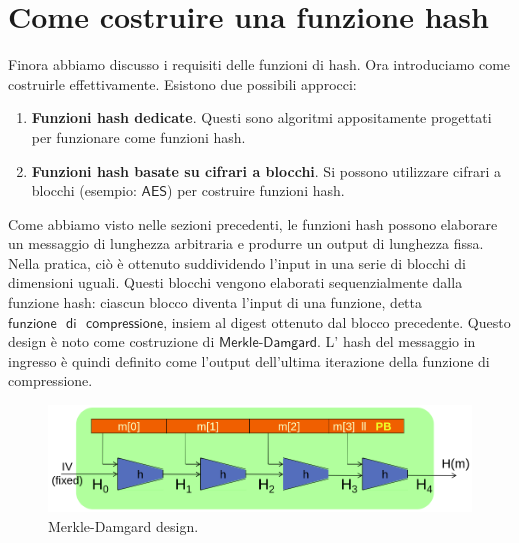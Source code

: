\documentclass{article}
\begin{document}
\section{Come costruire una funzione hash}
\par \noindent Finora abbiamo discusso i requisiti delle funzioni di hash. Ora introduciamo come costruirle effettivamente. 
Esistono due possibili approcci:

\begin{enumerate}
    \item \textbf{Funzioni hash dedicate}. Questi sono algoritmi appositamente progettati per funzionare come funzioni hash.
    \item \textbf{Funzioni hash basate su cifrari a blocchi}. Si possono utilizzare cifrari a blocchi (esempio: $\mathsf{AES}$) per costruire funzioni hash.
\end{enumerate}

\noindent Come abbiamo visto nelle sezioni precedenti, le funzioni hash possono elaborare un messaggio di lunghezza 
arbitraria e produrre un output di lunghezza fissa. Nella pratica, ciò è ottenuto suddividendo l'input in una serie 
di blocchi di dimensioni uguali. Questi blocchi vengono elaborati sequenzialmente dalla funzione hash: ciascun blocco 
diventa l'input di una funzione, detta $\mathsf{funzione \text{ } di \text{ } compressione}$, insiem al digest ottenuto 
dal blocco precedente. Questo design è noto come costruzione di $\mathsf{Merkle\text{-}Damgard}$. L' hash del messaggio 
in ingresso è quindi definito come l'output dell'ultima iterazione della funzione di compressione.

\begin{figure}
    \centering
    \includegraphics[width=0.65\linewidth]{figures/merkle-damgard.png}
    \caption{\label{fig:merkle_damgard}Merkle-Damgard design.}
\end{figure}

\end{document}
